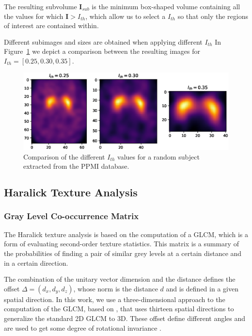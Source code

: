 The resulting subvolume $\mathbf{I}_{sub}$ is the minimum box-shaped volume containing all the values for which $\mathbf{I}>I_{th}$, which allow us to select a $I_{th}$ so that only the regions of interest are contained within. 

Different subimages and sizes are obtained when applying different $I_{th}$ In Figure~\ref{fig:comparisonIth} we depict a comparison between the resulting images for $I_{th} = [0.25, 0.30, 0.35]$. 

\begin{figure}
	\centering
	\includegraphics[width=0.90\columnwidth]{Graphics/ch5/comparisonIth.eps}
	\caption[Comparison of the different $I_{th}$ values.]{Comparison of the different $I_{th}$ values for a random subject extracted from the PPMI database.}
	\label{fig:comparisonIth}
\end{figure}

\subsection{Haralick Texture Analysis}\label{sec:haralick}
\subsubsection{Gray Level Co-occurrence Matrix}
The Haralick texture analysis is based on the computation of a \acf{GLCM}, which is a form of evaluating second-order texture statistics. This matrix is a summary of the probabilities of finding a pair of similar grey levels at a certain distance and in a certain direction. 

The combination of the unitary vector dimension and the distance defines the offset $\Delta=(d_x,d_y,d_z)$, whose norm is the distance $d$ and is defined in a given spatial direction. In this work, we use a three-dimensional approach to the computation of the \ac{GLCM}, based on \cite{Philips2008}, that uses thirteen spatial directions to generalize the standard 2D \ac{GLCM} to 3D. These offset define different angles and are used to get some degree of rotational invariance \cite{Philips2008}. 

